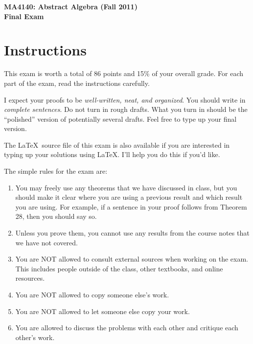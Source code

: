 \documentclass[11pt]{article}
\theoremstyle{definition}
\begin{document}
\begin{center}

{\Large\bf MA4140: Abstract Algebra (Fall 2011)}\\
\smallskip
{\Large\bf Final Exam}

\bigskip

  
  \bigskip
  

\end{center}

\setlength{\fboxsep}{10pt}

\section*{Instructions}

This exam is worth a total of 86 points and 15\% of your overall grade.  For each part of the exam, read the instructions carefully.

\bigskip

I expect your proofs to be \emph{well-written, neat, and organized}.  You should write in \emph{complete sentences}.  Do not turn in rough drafts.  What you turn in should be the ``polished'' version of potentially several drafts.  Feel free to type up your final version.  

\bigskip

The \LaTeX\ source file of this exam is also available if you are interested in typing up your solutions using \LaTeX.  I'll help you do this if you'd like.

\bigskip

The simple rules for the exam are:

\begin{enumerate}
\item You may freely use any theorems that we have discussed in class, but you should make it clear where you are using a previous result and which result you are using.  For example, if a sentence in your proof follows from Theorem 28, then you should say so.
\item Unless you prove them, you cannot use any results from the course notes that we have not covered.
\item You are NOT allowed to consult external sources when working on the exam.  This includes people outside of the class, other textbooks, and online resources.
\item You are NOT allowed to copy someone else's work.
\item You are NOT allowed to let someone else copy your work.
\item You are allowed to discuss the problems with each other and critique each other's work.
\end{enumerate}
\end{document}
